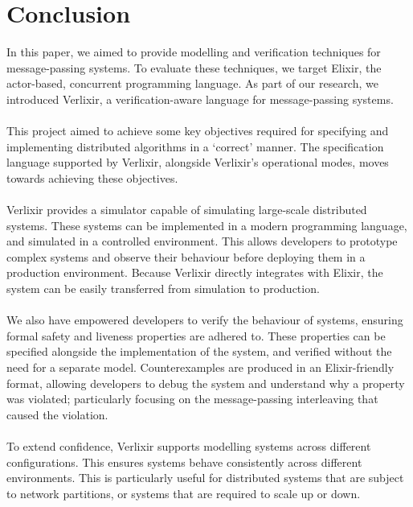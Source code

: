 \chapter{Conclusion}
In this paper, we aimed to provide modelling and verification techniques for message-passing systems. To evaluate these techniques, we target Elixir, the actor-based, concurrent programming language. As part of our research, we introduced Verlixir, a verification-aware language for message-passing systems.
\\ \\
This project aimed to achieve some key objectives required for specifying and implementing distributed algorithms in a `correct' manner. The specification language supported by Verlixir, alongside Verlixir's operational modes, moves towards achieving these objectives.
\\ \\
Verlixir provides a simulator capable of simulating large-scale distributed systems. These systems can be implemented in a modern programming language, and simulated in a controlled environment. This allows developers to prototype complex systems and observe their behaviour before deploying them in a production environment. Because Verlixir directly integrates with Elixir, the system can be easily transferred from simulation to production.
\\ \\
We also have empowered developers to verify the behaviour of systems, ensuring formal safety and liveness properties are adhered to. These properties can be specified alongside the implementation of the system, and verified without the need for a separate model. Counterexamples are produced in an Elixir-friendly format, allowing developers to debug the system and understand why a property was violated; particularly focusing on the message-passing interleaving that caused the violation.
\\ \\
To extend confidence, Verlixir supports modelling systems across different configurations. This ensures systems behave consistently across different environments. This is particularly useful for distributed systems that are subject to network partitions, or systems that are required to scale up or down.
